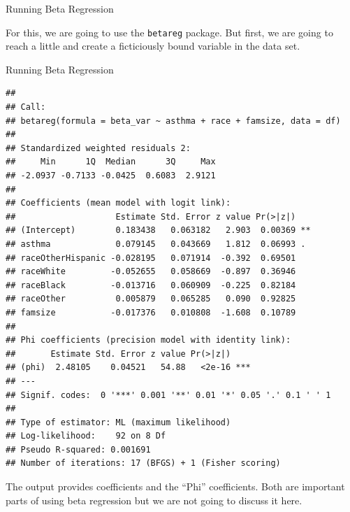 \begin{frame}[fragile]{Running Beta Regression}

For this, we are going to use the \texttt{betareg} package. But first,
we are going to reach a little and create a ficticiously bound variable
in the data set.

\begin{Shaded}
\begin{Highlighting}[]
\OperatorTok{$}\StringTok{ }\NormalTok{(}\NormalTok{, }\NormalTok{), }
                       \OperatorTok{$}
                       \NormalTok{)}
\StringTok{ }\OperatorTok{~}\StringTok{ }\OperatorTok{+}\StringTok{ }\OperatorTok{+}\StringTok{ }
\end{Highlighting}
\end{Shaded}

\end{frame}

\begin{frame}[fragile]{Running Beta Regression}

\begin{verbatim}
## 
## Call:
## betareg(formula = beta_var ~ asthma + race + famsize, data = df)
## 
## Standardized weighted residuals 2:
##     Min      1Q  Median      3Q     Max 
## -2.0937 -0.7133 -0.0425  0.6083  2.9121 
## 
## Coefficients (mean model with logit link):
##                    Estimate Std. Error z value Pr(>|z|)   
## (Intercept)        0.183438   0.063182   2.903  0.00369 **
## asthma             0.079145   0.043669   1.812  0.06993 . 
## raceOtherHispanic -0.028195   0.071914  -0.392  0.69501   
## raceWhite         -0.052655   0.058669  -0.897  0.36946   
## raceBlack         -0.013716   0.060909  -0.225  0.82184   
## raceOther          0.005879   0.065285   0.090  0.92825   
## famsize           -0.017376   0.010808  -1.608  0.10789   
## 
## Phi coefficients (precision model with identity link):
##       Estimate Std. Error z value Pr(>|z|)    
## (phi)  2.48105    0.04521   54.88   <2e-16 ***
## ---
## Signif. codes:  0 '***' 0.001 '**' 0.01 '*' 0.05 '.' 0.1 ' ' 1 
## 
## Type of estimator: ML (maximum likelihood)
## Log-likelihood:    92 on 8 Df
## Pseudo R-squared: 0.001691
## Number of iterations: 17 (BFGS) + 1 (Fisher scoring)
\end{verbatim}

The output provides coefficients and the ``Phi'' coefficients. Both are
important parts of using beta regression but we are not going to discuss
it here.

\end{frame}

